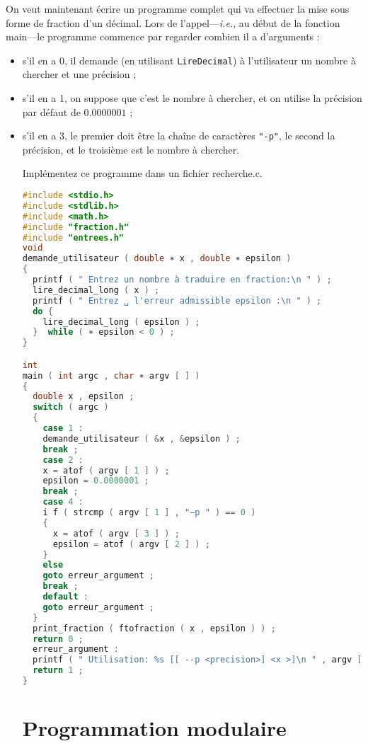 On veut maintenant écrire un programme complet qui va effectuer la
mise sous forme de fraction d’un décimal. Lors de
l’appel---\textit{i.e.}, au début de la fonction main---le programme
commence par regarder combien il a d’arguments :
\begin{itemize}
\item s’il en a 0, il demande (en utilisant \texttt{LireDecimal}) à
  l’utilisateur un nombre à chercher et une précision ;
\item s’il en a 1, on suppose que c’est le nombre à chercher, et on
  utilise la précision par défaut de \(0.0000001\) ;
\item s’il en a 3, le premier doit être la chaîne de caractères
  \texttt{"-p"}, le second la précision, et le troisième est le nombre
  à chercher.


Implémentez ce programme dans un fichier recherche.c.
\begin{solutioncachee}
  \begin{lstlisting}[language=C]
#include <stdio.h>
#include <stdlib.h>
#include <math.h>
#include "fraction.h"
#include "entrees.h"
void
demande_utilisateur ( double ∗ x , double ∗ epsilon )
{
  printf ( " Entrez un nombre à traduire en fraction:\n " ) ;
  lire_decimal_long ( x ) ;
  printf ( " Entrez ␣ l'erreur admissible epsilon :\n " ) ;
  do {
    lire_decimal_long ( epsilon ) ;
  }  while ( ∗ epsilon < 0 ) ;
}

int
main ( int argc , char ∗ argv [ ] )
{
  double x , epsilon ;
  switch ( argc )
  {
    case 1 :
    demande_utilisateur ( &x , &epsilon ) ;
    break ;
    case 2 :
    x = atof ( argv [ 1 ] ) ;
    epsilon = 0.0000001 ;
    break ;
    case 4 :
    i f ( strcmp ( argv [ 1 ] , "−p " ) == 0 )
    {
      x = atof ( argv [ 3 ] ) ;
      epsilon = atof ( argv [ 2 ] ) ;
    }
    else
    goto erreur_argument ;
    break ;
    default :
    goto erreur_argument ;
  }
  print_fraction ( ftofraction ( x , epsilon ) ) ;
  return 0 ;
  erreur_argument :
  printf ( " Utilisation: %s [[ --p <precision>] <x >]\n " , argv [ 0 ] ) ;
  return 1 ;
}

\end{lstlisting}
\end{solutioncachee}

\section{Programmation modulaire}


\end{itemize}
